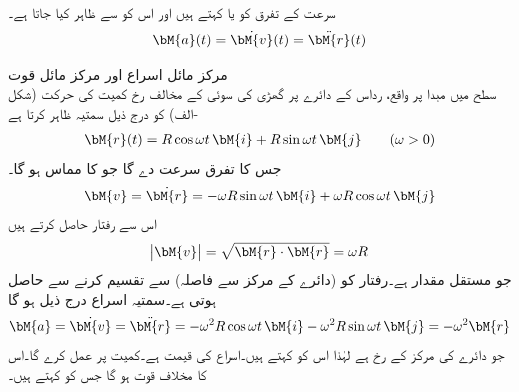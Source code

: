 سرعت کے تفرق کو  یا  کہتے ہیں اور اس کو   سے ظاہر کیا جاتا ہے۔
\begin{align}
\bM{a}(t)=\dot{\bM{v}}(t)=\ddot{\bM{r}}(t)
\end{align} 

\quad مرکز مائل اسراع اور مرکز مائل قوت\\
 سطح میں مبدا پر واقع، رداس  کے دائرے  پر گھڑی کی سوئی کے مخالف رخ کمیت  کی حرکت (شکل -الف)  کو درج ذیل سمتیہ ظاہر کرتا ہے
\begin{align*}
\bM{r}(t)=R\cos \omega t\,\bM{i}+R\sin \omega t\,\bM{j}\quad \quad (\omega >0)
\end{align*}
جس کا تفرق سرعت دے گا جو  کا مماس ہو گا۔
\begin{align*}
\bM{v}=\dot{\bM{r}}=-\omega R\sin \omega t\,\bM{i}+\omega R\cos \omega t \,\bM{j}
\end{align*}
اس سے رفتار حاصل کرتے ہیں 
\begin{align*}
\abs{\bM{v}}=\sqrt{\bM{r}\cdot \bM{r}}=\omega R
\end{align*}
جو مستقل  مقدار ہے۔رفتار کو (دائرے کے مرکز سے فاصلہ)  سے تقسیم کرنے سے   حاصل ہوتی ہے۔سمتیہ اسراع درج ذیل ہو گا
\begin{align}\label{مساوات_الاحصاء_اسراع_رفتار_حرکت}
\bM{a}=\dot{\bM{v}}=\ddot{\bM{r}}=-\omega^2R\cos \omega t\,\bM{i}-\omega^2R\sin \omega t\,\bM{j}=-\omega^2\bM{r}
\end{align}
جو دائرے کی مرکز کے رخ ہے لہٰذا اس کو  کہتے ہیں۔اسراع کی قیمت  ہے۔کمیت  پر   عمل کرے گا۔اس کا مخلاف قوت  ہو گا جس کو  کہتے ہیں۔
